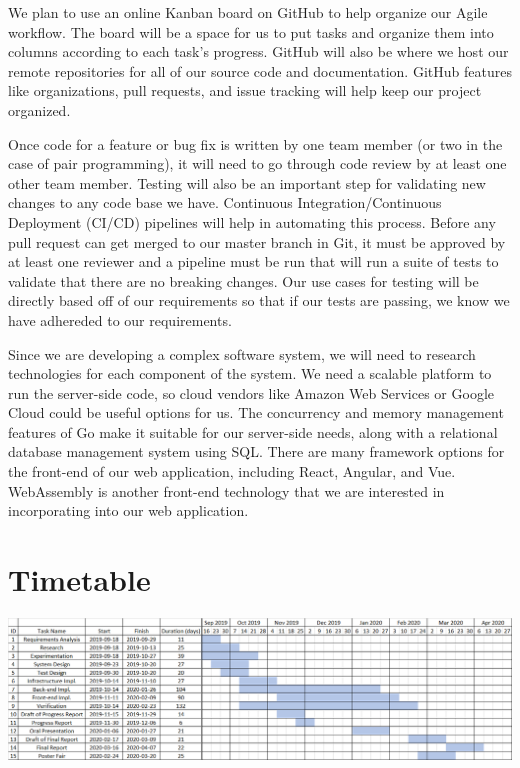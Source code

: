 \documentclass[11pt,letterpaper]{report}
\begin{document}
	We plan to use an online Kanban board on GitHub to help organize our Agile
	workflow. The board will be a space for us to put tasks and organize them
	into columns according to each task's progress. GitHub will also be where
	we host our remote repositories for all of our source code and
	documentation. GitHub features like organizations, pull requests, and issue
	tracking will help keep our project organized.

	Once code for a feature or bug fix is written by one team member (or two in
	the case of pair programming), it will need to go through code review by at
	least one other team member. Testing will also be an important step for
	validating new changes to any code base we have. Continuous
	Integration/Continuous Deployment (CI/CD) pipelines will help in automating
	this process. Before any pull request can get merged to our master branch
	in Git, it must be approved by at least one reviewer and a pipeline must be
	run that will run a suite of tests to validate that there are no breaking
	changes. Our use cases for testing will be directly based off of our
	requirements so that if our tests are passing, we know we have adhereded to
	our requirements.

	Since we are developing a complex software system, we will need to research
	technologies for each component of the system. We need a scalable platform
	to run the server-side code, so cloud vendors like Amazon Web Services or
	Google Cloud could be useful options for us. The concurrency and memory
	management features of Go make it suitable for our server-side needs, along
	with a relational database management system using SQL. There are many
	framework options for the front-end of our web application, including
	React, Angular, and Vue. WebAssembly is another front-end technology that
	we are interested in incorporating into our web application.

	\section*{Timetable}
	\markright{}
	\includegraphics[width=\linewidth]{timetable.png}
\end{document}
